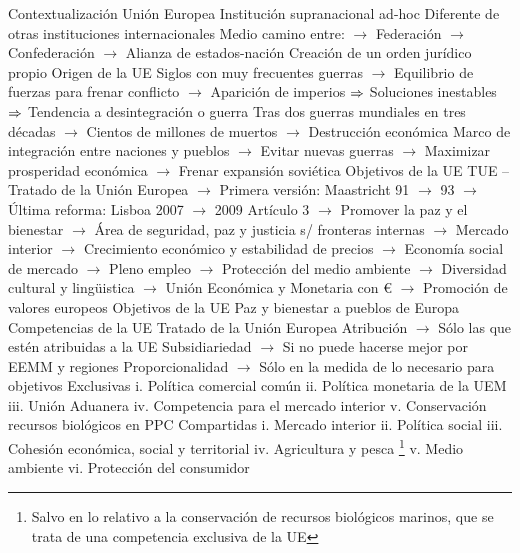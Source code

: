 \documentclass{nuevotema}
\begin{document}
\begin{esquemal}
	\1[] 
		\2 Contextualización
			\3 Unión Europea
				\4 Institución supranacional ad-hoc
				\4[] Diferente de otras instituciones internacionales
				\4[] Medio camino entre:
				\4[] $\to$ Federación
				\4[] $\to$ Confederación
				\4[] $\to$ Alianza de estados-nación
				\4[] Creación de un orden jurídico propio
				\4 Origen de la UE
				\4[] Siglos con muy frecuentes guerras
				\4[] $\to$ Equilibrio de fuerzas para frenar conflicto
				\4[] $\to$ Aparición de imperios
				\4[] $\Rightarrow$ Soluciones inestables
				\4[] $\Rightarrow$ Tendencia a desintegración o guerra
				\4[] Tras dos guerras mundiales en tres décadas
				\4[] $\to$ Cientos de millones de muertos
				\4[] $\to$ Destrucción económica
				\4[] Marco de integración entre naciones y pueblos
				\4[] $\to$ Evitar nuevas guerras
				\4[] $\to$ Maximizar prosperidad económica
				\4[] $\to$ Frenar expansión soviética
				\4 Objetivos de la UE
				\4[] TUE -- Tratado de la Unión Europea
				\4[] $\to$ Primera versión: Maastricht 91 $\to$ 93
				\4[] $\to$ Última reforma: Lisboa 2007 $\to$ 2009
				\4[] Artículo 3
				\4[] $\to$ Promover la paz y el bienestar
				\4[] $\to$ Área de seguridad, paz y justicia s/ fronteras internas
				\4[] $\to$ Mercado interior
				\4[] $\to$ Crecimiento económico y estabilidad de precios
				\4[] $\to$ Economía social de mercado
				\4[] $\to$ Pleno empleo
				\4[] $\to$ Protección del medio ambiente
				\4[] $\to$ Diversidad cultural y lingüistica
				\4[] $\to$ Unión Económica y Monetaria con €
				\4[] $\to$ Promoción de valores europeos
				\4[$\to$] Objetivos de la UE
				\4[] Paz y bienestar a pueblos de Europa
			\3 Competencias de la UE
				\4 Tratado de la Unión Europea
				\4[] Atribución
				\4[] $\to$ Sólo las que estén atribuidas a la UE
				\4[] Subsidiariedad
				\4[] $\to$ Si no puede hacerse mejor por EEMM y regiones
				\4[] Proporcionalidad
				\4[] $\to$ Sólo en la medida de lo necesario para objetivos
				\4 Exclusivas
				\4[] i. Política comercial común
				\4[] ii. Política monetaria de la UEM
				\4[] iii. Unión Aduanera
				\4[] iv. Competencia para el mercado interior
				\4[] v. Conservación recursos biológicos en PPC
				\4 Compartidas
				\4[] i. Mercado interior
				\4[] ii. Política social
				\4[] iii. Cohesión económica, social y territorial
				\4[] iv. Agricultura y pesca \footnote{Salvo en lo relativo a la conservación de recursos biológicos marinos, que se trata de una competencia exclusiva de la UE}
				\4[] v. Medio ambiente
				\4[] vi. Protección del consumidor

\end{esquemal}
\end{document}
